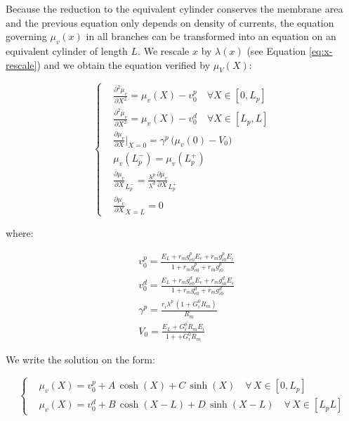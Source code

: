 \documentclass[colorlinks]{article}
\begin{document}
Because the reduction to the equivalent cylinder conserves the
membrane area and the previous equation only depends on density of
currents, the equation governing $\mu_v(x)$ in all branches can be
transformed into an equation on an equivalent cylinder of length $L$.
We rescale $x$ by $\lambda(x)$ (see Equation \ref{eq:x-rescale}) and we
obtain the equation verified by \(\mu_V(X)\):

\begin{equation}
\label{eq:model-equation-muV-rescaled}
\left\{
\begin{split}
& \frac{\partial^2 \mu_v}{\partial X^2} = \mu_v(X)-v_0^p \quad \forall X \in [0,L_p] \\
&\frac{\partial^2 \mu_v}{\partial X^2} = \mu_v(X)-v_0^d \quad \forall X \in [L_p,L]  \\
&\frac{\partial \mu_v}{\partial X}|_{X=0} = \gamma^p \, 
\Big( \mu_v(0) - V_0  \Big) \\
&\mu_v(L_p^-) = \mu_v(L_p^+) \\
&\frac{\partial \mu_v}{\partial X}_{L_p^-} = \frac{\lambda^p}{\lambda^d}
\frac{\partial \mu_v}{\partial X}_{L_p^+} \\
&\frac{\partial \mu_v}{\partial X}_{X=L} = 0 
\end{split}
\right.
\end{equation}

where:

\begin{equation}
\begin{split}
& v_0^p = \frac{E_L + r_m g_{e0}^p E_e + r_m g_{i0}^p E_i}{ 1 + r_m g_{e0}^p + r_m g_{i0}^p }\\
& v_0^d = \frac{E_L + r_m g_{e0}^d E_e + r_m g_{i0}^d E_i}{ 1 + r_m g_{e0}^d + r_m g_{i0}^d }\\
& \gamma^p = \frac{r_i \lambda^p \, (1+ G_i^0 R_m)}{R_m}\\
& V_0 = \frac{E_L + G_i^0 R_m E_i}{ 1 +  + G_i^0 R_m }
\end{split}
\end{equation}

We write the solution on the form:

\begin{equation}
\left\{
\begin{split}
& \mu_v(X) = v_0^p + A \, \cosh(X) + C \, \sinh(X) \quad \forall \, X \in [0,L_p] \\
& \mu_v(X) = v_0^d + B \, \cosh(X-L) + D \, \sinh(X-L) \quad \forall \, X \in [L_pL]
\end{split}
\right.
\label{eq:muV-final}
\end{equation}
\end{document}
